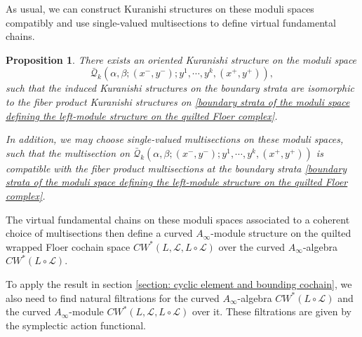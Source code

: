 \documentclass{amsart}
\newtheorem{proposition}[theorem]{Proposition}
\numberwithin{equation}{section}
\numberwithin{figure}{section}
\begin{document}
	As usual, we can construct Kuranishi structures on these moduli spaces compatibly and use single-valued multisections to define virtual fundamental chains. \par

\begin{proposition}
	There exists an oriented Kuranishi structure on the moduli space \begin{equation*}
\bar{\mathcal{Q}}_{k}(\alpha, \beta; (x^{-}, y^{-}); y^{1}, \cdots, y^{k}, (x^{+}, y^{+})),
\end{equation*}
such that the induced Kuranishi structures on the boundary strata are isomorphic to the fiber product Kuranishi structures on \eqref{boundary strata of the moduli space defining the left-module structure on the quilted Floer complex}. \par
	In addition, we may choose single-valued multisections on these moduli spaces, such that the multisection on $\bar{\mathcal{Q}}_{k}(\alpha, \beta; (x^{-}, y^{-}); y^{1}, \cdots, y^{k}, (x^{+}, y^{+}))$ is compatible with the fiber product multisections at the boundary strata \eqref{boundary strata of the moduli space defining the left-module structure on the quilted Floer complex}.
\end{proposition}

	The virtual fundamental chains on these moduli spaces associated to a coherent choice of multisections then define a curved $A_{\infty}$-module structure on the quilted wrapped Floer cochain space $CW^{*}(L, \mathcal{L}, L \circ \mathcal{L})$ over the curved $A_{\infty}$-algebra $CW^{*}(L \circ \mathcal{L})$. \par

	To apply the result in section \ref{section: cyclic element and bounding cochain}, we also need to find natural filtrations for the curved $A_{\infty}$-algebra $CW^{*}(L \circ \mathcal{L})$ and the curved $A_{\infty}$-module $CW^{*}(L, \mathcal{L}, L \circ \mathcal{L})$ over it. These filtrations are given by the symplectic action functional. \par
\end{document}
